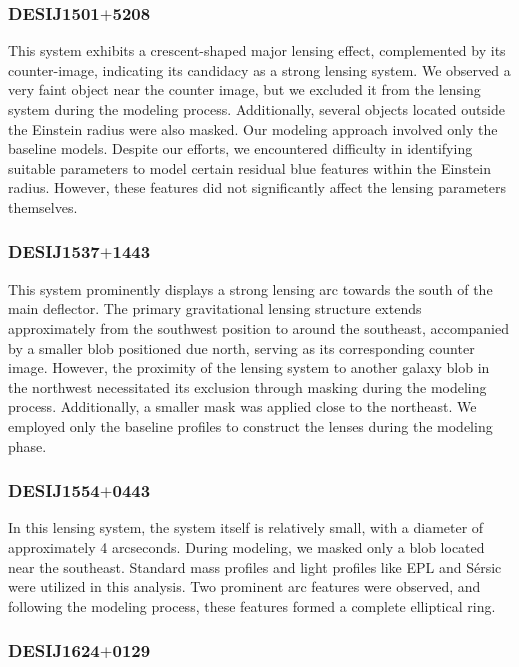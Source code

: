 \documentclass{aa}
\begin{document}
\subsubsection{DESIJ1501$+$5208}

This system exhibits a crescent-shaped major lensing effect, complemented by its counter-image, indicating its candidacy as a strong lensing system. We observed a very faint object near the counter image, but we excluded it from the lensing system during the modeling process. Additionally, several objects located outside the Einstein radius were also masked. Our modeling approach involved only the baseline models. Despite our efforts, we encountered difficulty in identifying suitable parameters to model certain residual blue features within the Einstein radius. However, these features did not significantly affect the lensing parameters themselves.

\subsubsection{DESIJ1537$+$1443}

This system prominently displays a strong lensing arc towards the south of the main deflector. The primary gravitational lensing structure extends approximately from the southwest position to around the southeast, accompanied by a smaller blob positioned due north, serving as its corresponding counter image. However, the proximity of the lensing system to another galaxy blob in the northwest necessitated its exclusion through masking during the modeling process. Additionally, a smaller mask was applied close to the northeast. We employed only the baseline profiles to construct the lenses during the modeling phase.

\subsubsection{DESIJ1554$+$0443}

In this lensing system, the system itself is relatively small, with a diameter of approximately 4 arcseconds. During modeling, we masked only a blob located near the southeast. Standard mass profiles and light profiles like EPL and S\'ersic  were utilized in this analysis. Two prominent arc features were observed, and following the modeling process, these features formed a complete elliptical ring.

\subsubsection{DESIJ1624$+$0129}
\end{document}
